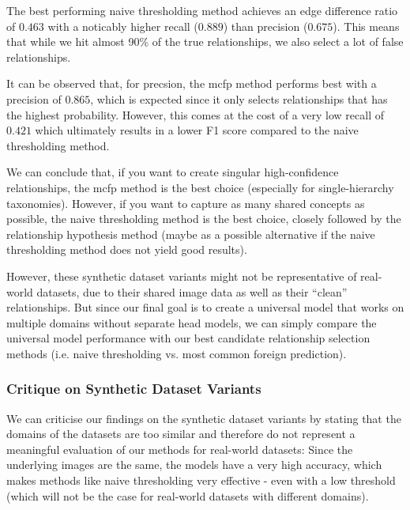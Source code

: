 The best performing naive thresholding method
achieves an edge difference ratio of $0.463$
with a noticably higher recall ($0.889$) than precision ($0.675$).
This means that while we hit almost 90\% of the true relationships,
we also select a lot of false relationships.

It can be observed that, for precsion, the mcfp method performs best
with a precision of $0.865$,
which is expected since it only selects relationships
that has the highest probability.
However, this comes at the cost of a very low recall of $0.421$
which ultimately results in a lower F1 score compared to the naive thresholding method.

We can conclude that, if you want to create singular high-confidence relationships,
the mcfp method is the best choice (especially for single-hierarchy taxonomies).
However, if you want to capture as many shared concepts as possible,
the naive thresholding method is the best choice, closely followed by the relationship hypothesis method
(maybe as a possible alternative if the naive thresholding method does not yield good results).



However, these synthetic dataset variants might not be representative of real-world datasets,
due to their shared image data as well as their \enquote{clean} relationships.
But since our final goal is to create a universal model that works on multiple domains
without separate head models, we can simply compare the universal model performance
with our best candidate relationship selection methods
(i.e. naive thresholding vs. most common foreign prediction).

\subsubsection{Critique on Synthetic Dataset Variants}

We can criticise our findings on the synthetic dataset variants
by stating that the domains of the datasets are too similar
and therefore do not represent a meaningful evaluation of our methods
for real-world datasets:
Since the underlying images are the same, the models have a very high accuracy,
which makes methods like naive thresholding very effective - even with a low threshold
(which will not be the case for real-world datasets with different domains).

